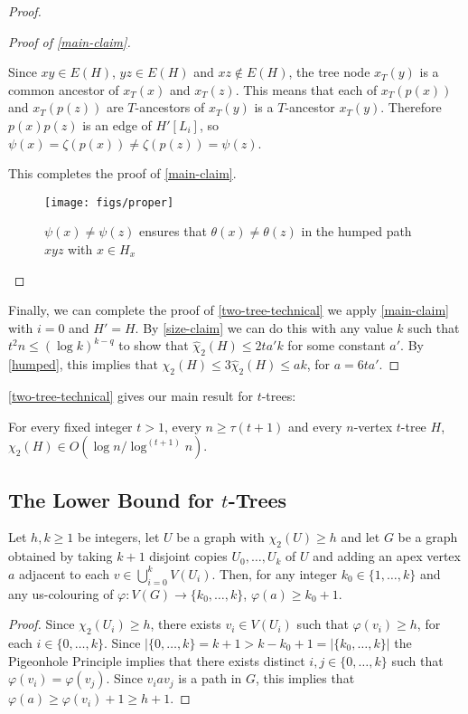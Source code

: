 \documentclass[kpfonts]{patmorin}
\newcommand{\uqs}{\chi_2}
\newcommand{\hus}{\hat{\chi}_2}
\theoremstyle{named}
\begin{document}
\begin{proof}
\begin{proof}[Proof of \cref{main-claim}]
\begin{compactenum}
          Since $xy\in E(H)$, $yz\in E(H)$ and $xz\not\in E(H)$, the tree node
          $x_T(y)$ is a common ancestor of $x_T(x)$ and $x_T(z)$.  This means that each of $x_T(p(x))$ and $x_T(p(z))$ are $T$-ancestors of $x_T(y)$  is a $T$-ancestor $x_T(y)$. Therefore $p(x)p(z)$ is an edge of $H'[L_i]$, so $\psi(x)=\zeta(p(x))\neq\zeta(p(z))=\psi(z)$.
      \end{compactenum}
      This completes the proof of \cref{main-claim}.
       \begin{figure}
           \begin{center}
            \texttt{[image: figs/proper]}
            \end{center}
           \caption{$\psi(x)\neq\psi(z)$ ensures that $\theta(x)\neq \theta(z)$ in the humped path $xyz$ with $x\in H_x$}
           \label{proper}
       \end{figure}
    \end{proof}
    Finally, we can complete the proof of \cref{two-tree-technical} we apply \cref{main-claim} with $i=0$ and $H'=H$.  By \cref{size-claim} we can do this with any value $k$ such that $t^2n \le (\log k)^{k-q}$ to show that $\hus(H)\le 2ta'k$ for some constant $a'$.  By \cref{humped}, this implies that $\uqs(H)\le 3\hus(H)\le ak$, for $a=6ta'$.
\end{proof}

\cref{two-tree-technical} gives our main result for $t$-trees:

\begin{thm}
    For every fixed integer $t>1$, every $n\ge \tau(t+1)$ and every $n$-vertex $t$-tree $H$, $\uqs(H)\in O(\log n/\log^{(t+1)} n)$.
\end{thm}



\subsection{The Lower Bound for $t$-Trees}

\begin{lem}\label{apex-graph}
    Let $h,k\ge 1$ be integers, let $U$ be a graph with $\uqs(U)\ge h$ and let $G$ be a graph obtained by taking $k+1$ disjoint copies $U_0,\ldots,U_k$ of $U$ and adding an apex vertex $a$ adjacent to each $v\in\bigcup_{i=0}^k V(U_i)$.  Then, for any integer $k_0\in \{1,\ldots,k\}$ and any us-colouring of $\varphi:V(G)\to\{k_0,\ldots,k\}$, $\varphi(a) \ge k_0+1$.
\end{lem}

\begin{proof}
    Since $\uqs(U_i)\ge h$, there exists $v_i\in V(U_i)$ such that $\varphi(v_i)\ge h$, for each $i\in\{0,\ldots,k\}$.  Since $|\{0,\ldots,k\}=k+1>k-k_0+1=|\{k_0,\ldots,k\}|$ the Pigeonhole Principle implies that there exists distinct $i,j\in\{0,\ldots,k\}$ such that $\varphi(v_i)=\varphi(v_j)$.  Since $v_i a v_j$ is a path in $G$, this implies that $\varphi(a)\ge \varphi(v_i)+1\ge h+1$.
\end{proof}
\end{document}

